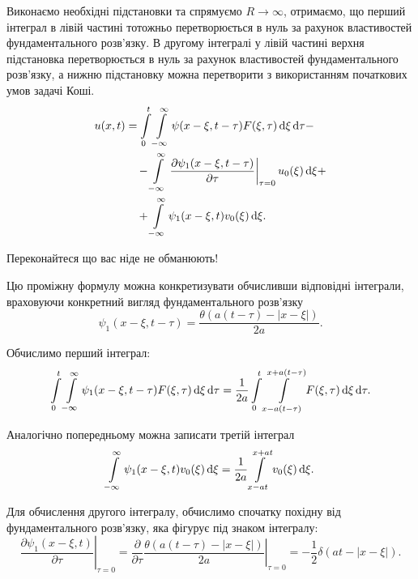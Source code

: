 Виконаємо необхідні підстановки та спрямуємо $R \to \infty$, отримаємо, що перший інтеграл в лівій частині тотожньо перетворюється в нуль за рахунок властивостей фундаментального розв'язку. В другому інтегралі у лівій частині верхня підстановка перетворюється в нуль за рахунок властивостей фундаментального розв'язку, а нижню підстановку можна перетворити з використанням початкових умов задачі Коші.
\begin{equation}
	\begin{aligned}
		u(x, t) &= \displaystyle\int\limits_0^t \displaystyle\int\limits_{-\infty}^\infty \psi(x - \xi, t - \tau) F(\xi, \tau) \mathop{}\!\mathrm{d} \xi \mathop{}\!\mathrm{d} \tau - \\
		& \quad - \displaystyle\int\limits_{-\infty}^\infty \left. \frac{\partial \psi_1(x - \xi, t - \tau)}{\partial \tau} \right|_{\tau = 0} u_0(\xi) \mathop{}\!\mathrm{d} \xi + \\
		& \quad + \displaystyle\int\limits_{-\infty}^\infty \psi_1(x - \xi, t) v_0(\xi) \mathop{}\!\mathrm{d} \xi.
	\end{aligned}
\end{equation}

\begin{exercise}
	Переконайтеся що вас ніде не обманюють!
\end{exercise}

Цю проміжну формулу можна конкретизувати обчисливши відповідні інтеграли, враховуючи конкретний вигляд фундаментального розв'язку
\begin{equation}
	\psi_1(x - \xi, t - \tau) = \frac{\theta(a(t - \tau) - |x - \xi|)}{2 a}.
\end{equation}

Обчислимо перший інтеграл:
\begin{equation}
	\displaystyle\int\limits_0^t \displaystyle\int\limits_{-\infty}^\infty \psi_1(x - \xi, t - \tau) F(\xi, \tau) \mathop{}\!\mathrm{d} \xi \mathop{}\!\mathrm{d} \tau = \frac{1}{2a} \displaystyle\int\limits_0^t \displaystyle\int\limits_{x - a(t - \tau)}^{x + a(t - \tau)} F(\xi, \tau) \mathop{}\!\mathrm{d} \xi \mathop{}\!\mathrm{d} \tau.
\end{equation}

Аналогічно попередньому можна записати третій інтеграл
\begin{equation}
	\displaystyle\int\limits_{-\infty}^\infty \psi_1(x - \xi, t) v_0(\xi) \mathop{}\!\mathrm{d} \xi = \frac{1}{2a} \displaystyle\int\limits_{x - a t}^{x + a t} v_0(\xi) \mathop{}\!\mathrm{d} \xi.
\end{equation}

Для обчислення другого інтегралу, обчислимо спочатку похідну від фундаментального розв'язку, яка фігурує під знаком інтегралу:
\begin{equation}
	\left. \frac{\partial \psi_1(x - \xi, t)}{\partial \tau} \right|_{\tau = 0} = \frac{\partial}{\partial \tau} \left. \frac{\theta(a(t - \tau) - |x - \xi|)}{2 a} \right|_{\tau = 0} = - \frac{1}{2} \delta(at - |x - \xi|).
\end{equation}

